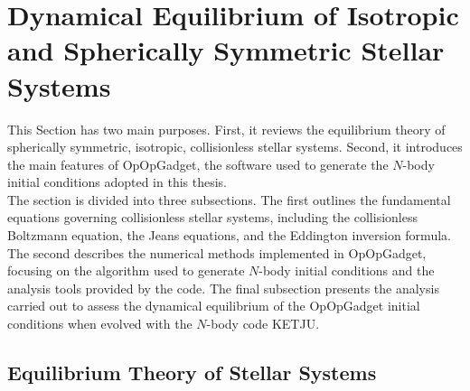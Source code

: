 \documentclass[12pt,twoside,openany]{book}
\begin{document}
\newpage









\section{Dynamical Equilibrium of Isotropic and Spherically Symmetric Stellar Systems}
\label{sec:Dynamical Equilibrium of Stellar Systems}

This Section has two main purposes. First, it reviews the equilibrium theory of spherically symmetric, isotropic, collisionless stellar systems. Second, it introduces the main features of OpOpGadget, the software used to generate the $N$-body initial conditions adopted in this thesis.\\The section is divided into three subsections. The first outlines the fundamental equations governing collisionless stellar systems, including the collisionless Boltzmann equation, the Jeans equations, and the Eddington inversion formula. The second describes the numerical methods implemented in OpOpGadget, focusing on the algorithm used to generate $N$-body initial conditions and the analysis tools provided by the code. The final subsection presents the analysis carried out to assess the dynamical equilibrium of the OpOpGadget initial conditions when evolved with the $N$-body code KETJU.





\subsection{Equilibrium Theory of Stellar Systems}
\end{document}
